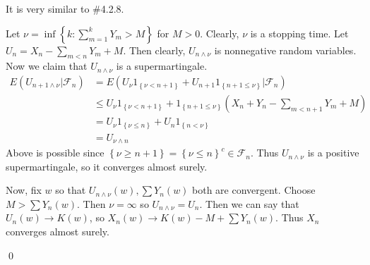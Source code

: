\begin{problem}[4.3.3] \hfill

	It is very similar to \#4.2.8.

	Let $\nu = \inf\left\{ k : \sum_{m=1}^k Y_m > M \right\}$ for $M>0$.
	Clearly, $\nu$ is a stopping time.
	Let $U_n = X_n - \sum_{m < n}Y_m + M$.
	Then clearly, $U_{n \wedge \nu}$ is nonnegative random variables.
	Now we claim that $U_{n \wedge \nu}$ is a supermartingale.
\[
	\begin{split}
		E\left( U_{n+1 \wedge \nu} | \mathcal{F}_n \right)
		& = E\left( U_{\nu} 1_{ \left\{ \nu < n+1 \right\}} + U_{n+1} 1_{ \left\{ n+1 \leq \nu \right\}} | \mathcal{F}_n \right)\\ 
		& \leq U_\nu 1_{ \left\{ \nu < n+1 \right\}} + 1_{\left \{n+1 \leq \nu \right \}} \left( X_n + Y_n - \sum_{m < n+1}Y_m +M \right)\\
		& = U_{\nu}1_{ \left\{ \nu \leq n \right\}} + U_n 1_{\left \{n < \nu \right \}} \\
		& = U_{\nu \wedge n}
	\end{split}
\]
Above is possible since $\left\{ \nu \geq n+1 \right\} = \left\{ \nu \leq n \right\}^c \in \mathcal{F}_n$.
Thus $U_{n \wedge \nu}$ is a positive supermartingale, so it converges almost surely.

Now, fix $w$ so that $U_{n\wedge \nu}(w), \sum Y_n(w)$ both are convergent.
Choose $M > \sum Y_n(w)$. Then $\nu = \infty$ so $U_{n \wedge \nu} = U_n$.
Then we can say that $U_n(w) \rightarrow K(w)$, so $X_n(w) \rightarrow K(w) - M + \sum Y_n(w)$.
Thus $X_n$ converges almost surely.

\qed

\end{problem}


